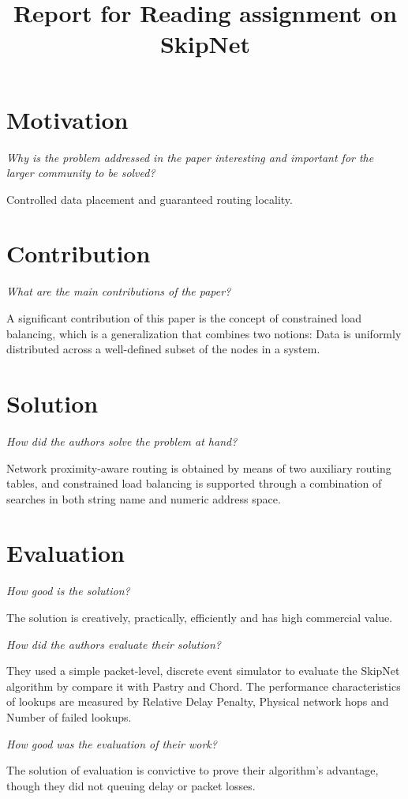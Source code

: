 \documentclass{article}
\title{Report for Reading assignment on SkipNet}
\begin{document}
\section{Motivation}
{\itshape Why is the problem addressed in the paper interesting and important for the larger community to be solved?}

Controlled data placement and guaranteed routing locality.


\section{Contribution}
{\itshape What are the main contributions of the paper?}

A significant contribution of this paper is the concept of constrained load balancing, which is a generalization that combines two notions: Data is uniformly distributed across a well-defined subset of the nodes in a system. 


\section{Solution}

{\itshape How did the authors solve the problem at hand?}

Network proximity-aware routing is obtained by means of two auxiliary routing tables, and constrained load balancing is supported through a combination of searches in both string name and numeric address space.


\section{Evaluation}
{\itshape How good is the solution?}

The solution is creatively, practically, efficiently and has high commercial value. 

{\itshape How did the authors evaluate their solution?}

They used a simple packet-level, discrete event simulator to evaluate the SkipNet algorithm by compare it with Pastry and Chord. The performance characteristics of lookups are measured by Relative Delay Penalty, Physical network hops and Number of failed lookups. 


{\itshape How good was the evaluation of their work?}

The solution of evaluation is convictive to prove their algorithm's advantage, though they did not queuing delay or packet losses. 
\end{document}
